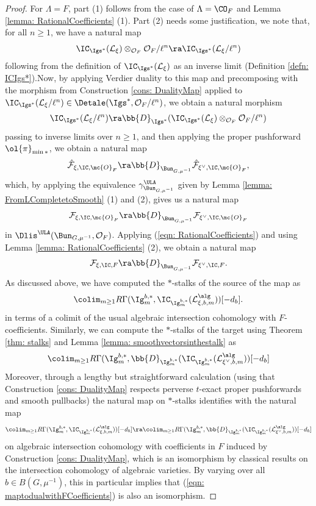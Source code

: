 \documentclass[letterpaper,11pt]{amsart}
\begin{document}
\begin{proof}
For $\Lambda=F$, part (1) follows from the case of $\Lambda=\CO_F$ and Lemma \ref{lemma: RationalCoefficients} (1). Part (2) needs some justification, we note that, for all $n \geq 1$, we have a natural map
\[ \IC_{\Igs^{*}}(\mathcal{L}_{\xi}) \otimes_{\mathcal{O}_{F}} \mathcal{O}_{F}/\ell^{n} \ra \IC_{\Igs^{*}}(\mathcal{L}_{\xi}/\ell^{n}) \]
following from the definition of $\IC_{\Igs^{*}}(\mathcal{L}_{\xi})$ as an inverse limit (Definition \ref{defn: ICIgs*}).Now, by applying Verdier duality to this map and precomposing with the morphism from Construction \ref{cons: DualityMap} applied to $\IC_{\Igs^{*}}(\mathcal{L}_{\xi}/\ell^{n}) \in \Detale(\Igs^{*},\mathcal{O}_{F}/\ell^{n})$, we obtain a natural morphism 
\[ \IC_{\Igs^{*}}(\mathcal{L}_{\xi}/\ell^{n}) \ra \bb{D}_{\Igs^{*}}(\IC_{\Igs^{*}}(\mathcal{L}_{\xi}) \otimes_{\mathcal{O}_{F}} \mathcal{O}_{F}/\ell^{n})  \]
passing to inverse limits over $n \geq 1$, and then applying the proper pushforward $\ol{\pi}_{\min*}$, we obtain a natural map 
\begin{equation}{\label{eqn: maptodualwithFCoefficients}}
 \hat{\mathcal{F}}_{\xi,\IC,\mc{O}_{F}} \ra \bb{D}_{\Bun_{G,\mu^{-1}}}\hat{\mathcal{F}}_{\xi^{\vee},\IC,\mc{O}_{F}}, 
\end{equation}
which, by applying the equivalence $\gamma^{\ULA}_{\Bun_{G,\mu^{-1}}}$ given by Lemma \ref{lemma: FromLCompletetoSmooth} (1) and (2), gives us a natural map 
\[ \mathcal{F}_{\xi,\IC,\mc{O}_{F}} \ra \bb{D}_{\Bun_{G,\mu^{-1}}}\mathcal{F}_{\xi^{\vee},\IC,\mc{O}_{F}} \]
in $\Dlis^{\ULA}(\Bun_{G,\mu^{-1}},\mathcal{O}_{F})$. Applying (\ref{eqn: RationalCoefficients}) and using Lemma \ref{lemma: RationalCoefficients} (2), we obtain a natural map 
\[ \mathcal{F}_{\xi,\IC,F} \ra \bb{D}_{\Bun_{G,\mu^{-1}}}\mathcal{F}_{\xi^{\vee},\IC,F}. \]
As discussed above, we have computed the $*$-stalks of the source of the map as
\[ \colim_{m \geq 1} R\Gamma(\Ig^{b,*}_{m},\IC_{\Ig^{b,*}_{m}}(\mathcal{L}_{\xi,b,m}^{\alg}))[-d_{b}]. \]
in terms of a colimit of the usual algebraic intersection cohomology with $F$-coefficients. Similarly, we can compute the $*$-stalks of the target using Theorem \ref{thm: stalks} and Lemma \ref{lemma: smoothvectorsinthestalk} as 
\[ \colim_{m \geq 1} R\Gamma(\Ig^{b,*}_{m},\bb{D}_{\Ig^{b,*}_{m}}(\IC_{\Ig^{b,*}_{m}}(\mathcal{L}_{\xi^\vee,b,m}^{\alg}))[-d_{b}] \]
Moreover, through a lengthy but straightforward calculation (using that Construction \ref{cons: DualityMap} respects perverse $t$-exact proper pushforwards and smooth pullbacks) the natural map on $*$-stalks identifies with the natural map 
\[ \colim_{m \geq 1} R\Gamma(\Ig^{b,*}_{m},\IC_{\Ig^{b,*}_{m}}(\mathcal{L}_{\xi,b,m}^{\alg}))[-d_{b}] \ra \colim_{m \geq 1} R\Gamma(\Ig^{b,*}_{m},\bb{D}_{\Ig^{b,*}_{m}}(\IC_{\Ig^{b,*}_{m}}(\mathcal{L}_{\xi^\vee,b,m}^{\alg}))[-d_{b}] \]
on algebraic intersection cohomology with coefficients in $F$ induced by Construction \ref{cons: DualityMap}, which is an isomorphism by classical results on the intersection cohomology of algebraic varieties. By varying over all $b \in B(G,\mu^{-1})$, this in particular implies that (\ref{eqn: maptodualwithFCoefficients}) is also an isomorphism. 


\end{proof}
\end{document}
